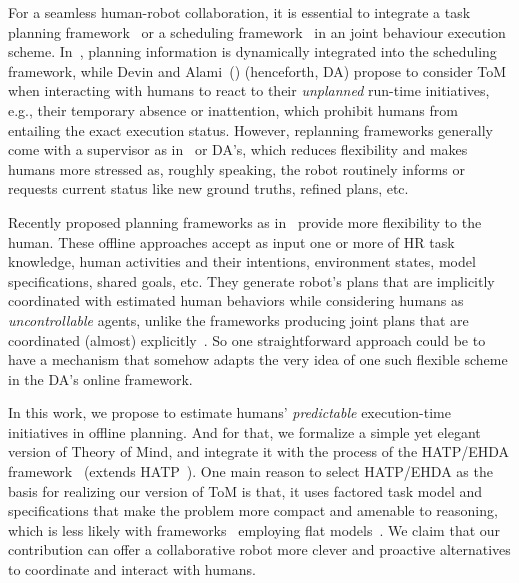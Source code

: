 \documentclass[letterpaper]{article} %
\begin{document}
For a seamless human-robot collaboration, it is essential to integrate a task planning framework~\cite{lallement2018hatp} or a scheduling framework~\cite{ferreira2021scheduling} in an  joint behaviour execution scheme. 
In~\cite{PupaS21}, planning information is dynamically integrated into the scheduling framework, while Devin and Alami~(\citeyear{devin2016implemented}) (henceforth, DA) propose to consider ToM when interacting with humans to react to their \textit{unplanned} run-time initiatives,
e.g., their temporary absence or inattention, which prohibit humans from entailing the exact execution status. 
However, replanning frameworks generally come with a supervisor as in~\cite{johannsmeier2016hierarchical} or DA's, which
reduces flexibility and makes humans more stressed as, roughly speaking, the robot routinely informs or requests current status like new ground truths, refined plans, etc.

Recently proposed planning frameworks as in~\cite{buisan:hal-03684211,UnhelkarLS19} provide more flexibility to the human. These offline approaches accept as input one or more of HR task knowledge, human activities and their intentions, environment states, model specifications, shared goals, etc. 
They generate robot's plans that are implicitly coordinated with estimated human behaviors while considering humans as {\em uncontrollable} agents, unlike the frameworks producing joint plans that are coordinated (almost) explicitly~\cite{alami2006toward,lallement2018hatp,roncone2017transparent}.
So one straightforward approach could be to have a mechanism that somehow adapts the very idea of one such flexible scheme in the DA's online framework. 

In this work, we propose to estimate humans' \textit{predictable} execution-time initiatives in offline planning. And for that, we formalize a simple yet elegant version of Theory of Mind, and  integrate it with the process of the HATP/EHDA framework~\cite{buisan:hal-03684211} (extends  HATP~\cite{lallement2018hatp,CirilloKS09}). 
One main reason to select HATP/EHDA as the basis for realizing our version of ToM is that, it uses factored task model and specifications that make the problem more compact and amenable to   reasoning, which is less likely with frameworks~\cite{unhelkar2019learning} employing flat models~\cite{levine2014concurrent,unhelkar2019learning}.
We claim that our contribution can offer a collaborative robot more clever and proactive alternatives to coordinate and interact with humans.
\end{document}
